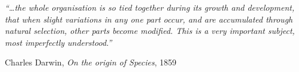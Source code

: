 \pagestyle{empty}  %

\null\vfill
\textit{``\dots the whole organisation is so tied together during its growth and development, that when slight variations in any one part occur, and are accumulated through natural selection, other parts become modified. This is a very important subject, most imperfectly understood.''}

\begin{flushright}
Charles Darwin, \emph{On the origin of Species}, 1859
\end{flushright}

\vfill\vfill\vfill\vfill\vfill\vfill\null
\cleardoublepage

